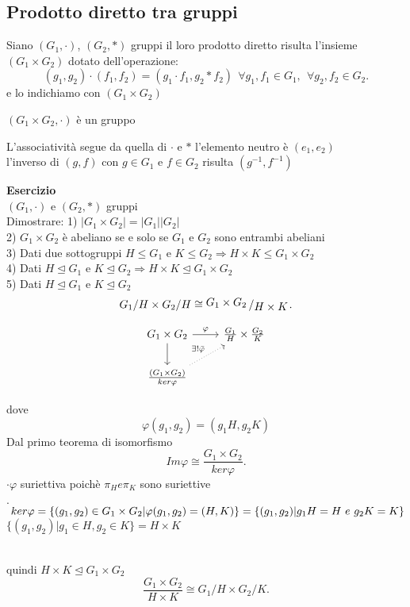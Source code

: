 \documentclass[12px]{article}
\begin{document}
	\subsection{Prodotto diretto tra gruppi}
	\begin{defi}
		Siano $(G_1,\cdot)$, $(G_2, *)$ gruppi il loro prodotto diretto risulta l'insieme $(G_1\times G_2)$ dotato dell'operazione:
		\[
			(g_1,g_2)\cdot(f_1,f_2) = (g_1\cdot f_1, g_2 * f_2) \ \ \forall g_1,f_1\in G_1, \ \ \forall g_2,f_2\in G_2
		.\]
		e lo indichiamo con $(G_1\times G_2)$
	\end{defi}
	\begin{prop}
		$(G_1\times G_2, \cdot)$ è un gruppo
	\end{prop}
	\begin{dimo}
		L'associatività segue da quella di $\cdot$ e  $*$ l'elemento neutro è  $(e_1,e_2)$\\
		l'inverso di $(g,f)$ con  $g\in G_1$ e $f\in G_2$ risulta $(g^{-1},f^{-1})$
	\end{dimo}
	\textbf{Esercizio}\\
	$(G_1, \cdot)$ e  $(G_2,*)$ gruppi\\
	Dimostrare:
	1) $|G_1\times G_2| = |G_1||G_2|$\\
	2) $G_1\times G_2$ è abeliano se e solo se $G_1$ e $G_2$ sono entrambi abeliani\\
	3) Dati due sottogruppi $H\leq G_1$ e $K\leq G_2 \Rightarrow H\times K\leq G_1\times G_2$ \\
	4) Dati $H\trianglelefteq G_1$ e $K\trianglelefteq G_2 \Rightarrow H\times K \trianglelefteq G_1\times G_2$ \\
	5) Dati  $H\trianglelefteq G_1$ e $K\trianglelefteq G_2$\\
	\[
		G_1/H \times G_2/H \cong \bigslant{G_1\times G_2}{H\times K}
	.\] 
	\begin{dimo}[4,5]
	\[
\begin{tikzcd}
G_1 \times G_2 \arrow[r, " \varphi"] \arrow[d] & \frac{G_1}{H} \times \frac{G_2}{K} \\
\frac{(G_1 \times G_2)}{ker \varphi} \arrow[ur, dotted, "\exists ! \bar \varphi"]
\end{tikzcd}
\]

dove 
\[
\varphi(g_1, g_2) = \left( g_1 H, g_2 K \right)
\]
	Dal primo teorema di isomorfismo
	\[
		Im \varphi \cong \frac {G_1\times G_2}{ker \varphi}
	.\] 
	$\cdot \varphi$ suriettiva poichè $\pi_H e \pi_K$ sono suriettive\\
	\begin{aligned*}
	$\cdot$ $\ ker \varphi = \{(g_1,g_2)\in G_1\times G_2| \varphi(g_1,g_2) = (H,K)\} \\= \{(g_1,g_2) | g_1H = H \ e \ g_2K = K\}$ \\
	$\{(g_1,g_2) | g_1\in H,g_2\in K\} = H\times K$
	\end{aligned*}\\
	quindi $H\times K\trianglelefteq G_1\times G_2$
	\[
		\frac{G_1\times G_2}{H\times K}\cong G_1/H\times G_2/K
	.\] 
	\end{dimo}
\end{document}
